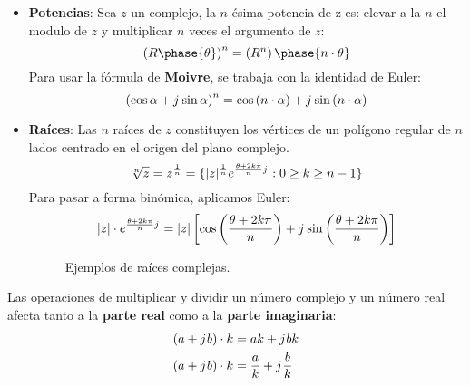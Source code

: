 \documentclass[
	12pt, %
	fleqn, %
	a4paper, %
]{LegrandOrangeBook}
\begin{document}
\begin{itemize}
\item \textbf{Potencias}: Sea $z$ un complejo, la $n$-ésima potencia de z es: elevar a la $n$ el modulo de $z$ y multiplicar $n$ veces el argumento de $z$:
\begin{equation*}
\left(R\phase{\theta}\right)^n=\left(R^n\right)\phase{n\cdot\theta}
\end{equation*}
Para usar la fórmula de \textbf{Moivre}, se trabaja con la identidad de Euler:
\begin{equation*}
\left(\cos\alpha+{j\mkern1mu}\sin\alpha\right)^n=\cos\left(n\cdot\alpha\right)+{j\mkern1mu}\sin\left(n\cdot\alpha\right)
\end{equation*}
\item \textbf{Raíces}: Las $n$ raíces de $z$ constituyen los vértices de un polígono regular de $n$ lados centrado en el origen del plano complejo.
\begin{equation*}
\sqrt[n]{z}=z^{\frac{1}{n}}=\lbrace|z|^{\frac{1}{n}}e^{\frac{\theta+2k\pi}{n}{j\mkern1mu}}:0\geq k \geq n-1\rbrace
\end{equation*}
Para pasar a forma binómica, aplicamos Euler:
\begin{equation*}
|z|\cdot e^{\frac{\theta+2k\pi}{n}{j\mkern1mu}}=|z|\left[\cos\left(\frac{\theta+2k\pi}{n}\right)+{j\mkern1mu}\sin\left(\frac{\theta+2k\pi}{n}\right)\right]
\end{equation*}
\begin{figure}[H]
\centering
{}
\caption{Ejemplos de raíces complejas.}
\end{figure}
\end{itemize}
\begin{remark}
Las operaciones de multiplicar y dividir un número complejo y un número real afecta tanto a la \textbf{parte real} como a la \textbf{parte imaginaria}:
\begin{align*}
(a+{j\mkern1mu} b)\cdot k&=ak+{j\mkern1mu} bk\\
(a+{j\mkern1mu} b)\cdot k&=\frac{a}{k}+{j\mkern1mu} \frac{b}{k}
\end{align*}
\end{remark}
\end{document}
